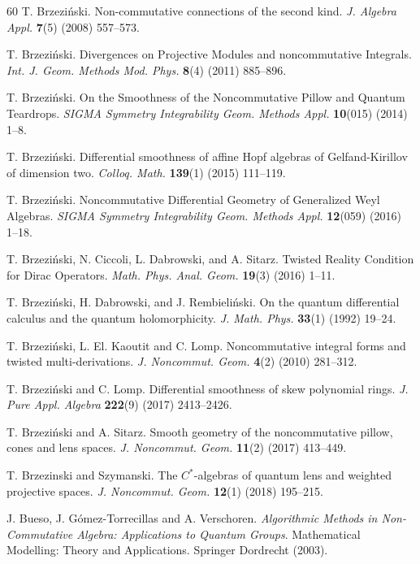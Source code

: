 \documentclass{amsart}
\theoremstyle{definition}
\theoremstyle{remark}
\numberwithin{equation}{section}
\begin{document}
\begin{thebibliography}{60}
 T. Brzezi{\'n}ski. Non-commutative connections of the second kind. {\em J. Algebra Appl.} {\bf 7}(5) (2008) 557--573.

 T. Brzezi{\'n}ski. Divergences on Projective Modules and noncommutative Integrals. {\em Int. J. Geom. Methods Mod. Phys.} {\bf 8}(4) (2011) 885--896.

 T. Brzezi{\'n}ski. On the Smoothness of the Noncommutative Pillow and Quantum Teardrops. {\em SIGMA Symmetry Integrability Geom. Methods Appl.} {\bf 10}(015) (2014) 1--8.

 T. Brzezi{\'n}ski. Differential smoothness of affine Hopf algebras of Gelfand-Kirillov of dimension two. {\em Colloq. Math.} {\bf 139}(1) (2015) 111--119.

 T. Brzezi\'nski. Noncommutative Differential Geometry of Generalized Weyl Algebras. {\em SIGMA Symmetry Integrability Geom. Methods Appl.} {\bf 12}(059) (2016) 1--18.

 T. Brzezi\'nski, N. Ciccoli, L. Dabrowski, and A. Sitarz. Twisted {R}eality {C}ondition for {D}irac {O}perators. {\em Math. Phys. Anal. Geom.} {\bf 19}(3) (2016) 1--11.

 T. Brzezi{\'n}ski, H. Dabrowski, and J. Rembieli\'nski. On the quantum differential calculus and the quantum holomorphicity. {\em J. Math. Phys.} {\bf 33}(1) (1992) 19--24.

 T. Brzezi{\'n}ski, L. El. Kaoutit and C. Lomp. Noncommutative integral forms and twisted multi-derivations. {\em J. Noncommut. Geom.} {\bf 4}(2) (2010) 281--312.

 T. Brzezi{\'n}ski and C. Lomp. Differential smoothness of skew polynomial rings. {\em J. Pure Appl. Algebra} {\bf 222}(9) (2017) 2413--2426.

 T. Brzezi\'nski and A. Sitarz. Smooth geometry of the noncommutative pillow, cones and lens spaces. {\em J. Noncommut. Geom.} {\bf 11}(2) (2017) 413--449.

 T. Brzezinski and Szymanski. The $C^{*}$-algebras of quantum lens and weighted projective spaces. {\em J. Noncommut. Geom.} {\bf 12}(1) (2018) 195--215.

 J. Bueso, J. G\'omez-Torrecillas and A. Verschoren. {\em Algorithmic Methods in Non-Commutative Algebra: Applications to Quantum Groups}. Mathematical Modelling: Theory and Applications. Springer Dordrecht (2003).


\end{thebibliography}
\end{document}

